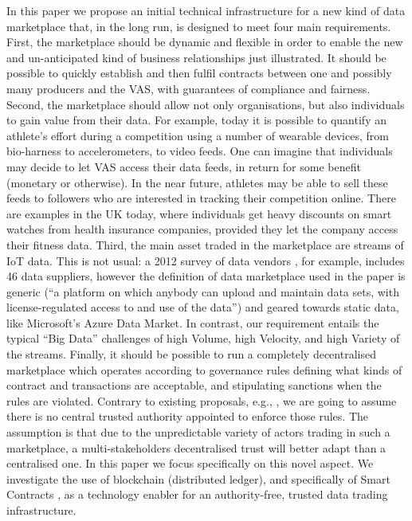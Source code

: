\documentclass[chi_draft]{sigchi}
\begin{document}
In this paper we propose an initial technical infrastructure for a new kind of data marketplace that, in the long run, is designed to meet four main requirements.
First, the marketplace should be dynamic and flexible in order to enable the new and un-anticipated kind of business relationships just illustrated. It should be possible to quickly  establish and then fulfil contracts between one and possibly many producers and the VAS, with guarantees of compliance and fairness.
%
Second, the marketplace should allow not only organisations, but also individuals to gain value from their data. 
%
For example, today it is possible to quantify an athlete's effort during a competition using a number of wearable devices, from bio-harness to accelerometers, to video feeds.
One can imagine that individuals may decide to let VAS access their data feeds, in return for some benefit (monetary or otherwise).
In the near future, athletes may be able to sell these feeds to followers who are interested in tracking their competition online.
There are examples in the UK today, where individuals get heavy discounts on smart watches from health insurance companies, provided they let the company access their fitness data.
%
Third, the main asset traded in the marketplace are streams of IoT data. This is not usual: a 2012 survey of data vendors \cite{Schomm2013}, for example, includes 46 data suppliers, however the definition of data marketplace used in the paper is generic (``a platform on which anybody can upload and maintain data sets, with license-regulated access to and use of the data'') and geared towards static data, like Microsoft's Azure Data Market.
In contrast, our requirement entails the typical ``Big Data'' challenges of high Volume, high Velocity, and high Variety of the streams.
%
Finally, it should be possible to run a completely decentralised marketplace which operates according to governance rules defining what kinds of contract and transactions are acceptable, and stipulating sanctions when the rules are violated. 
Contrary to existing proposals, e.g., \cite{Cao:2016:MMR:2926746.2883611}, we are going to assume  there is no central trusted authority appointed to enforce those rules. The assumption is that due to the unpredictable variety of actors trading  in such a marketplace, a multi-stakeholders decentralised trust will better adapt than a centralised one.
In this paper we focus specifically on this novel aspect. We investigate the use of blockchain (distributed ledger), and specifically of Smart Contracts \cite{Buterin2014}, as a technology enabler for an authority-free, trusted data trading infrastructure.
\end{document}
